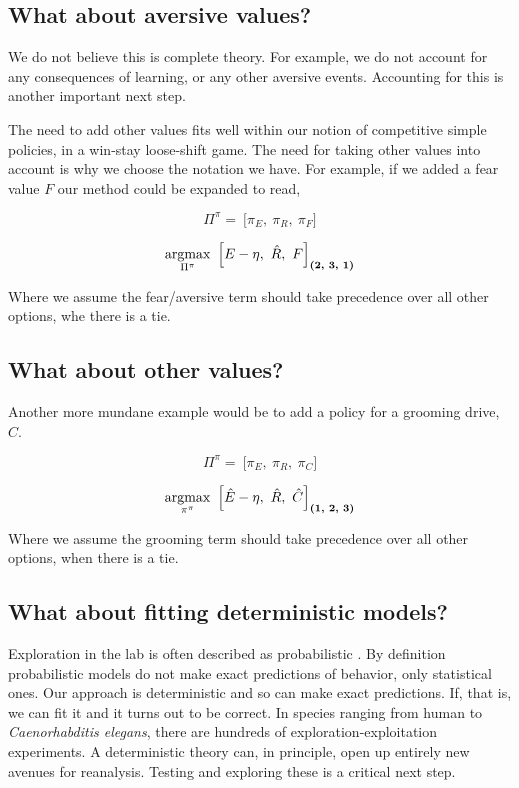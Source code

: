 \subsection*{What about aversive values?}
We do not believe this is complete theory. For example, we do not account for any consequences of learning, or any other aversive events. Accounting for this is another important next step.

The need to add other values fits well within our notion of competitive simple policies, in a win-stay loose-shift game. The need for taking other values into account is why we choose the notation we have. For example, if we added a fear value $F$ our method could be expanded to read,

\begin{equation}
\label{eq:pipi_f} 
\Pi^{\pi} = \ \Big [ \pi_E,\ \pi_R,\ \pi_F \Big ]
\end{equation}

\begin{equation}
\label{eq:meta_greedy_f} 
	\operatorname*{argmax}_{\Pi^{\pi}} \ \Big [ E - \eta,\ \hat R,\ F \Big ]_{\textbf{(2, 3, 1)}}
\end{equation}

Where we assume the fear/aversive term should take precedence over all other options, whe there is a tie. 


\subsection*{What about other values?}
Another more mundane example would be to add a policy for a grooming drive, $C$. 

\begin{equation}
\label{eq:pipi_g} 
\Pi^{\pi} = \ \Big [ \pi_E,\ \pi_R,\ \pi_C \Big ]
\end{equation}

\begin{equation}
\label{eq:meta_greedy_g} 
	\operatorname*{argmax}_{\pi^{\pi}} \ \Big [ \hat E - \eta,\ \hat R, \ \hat C \Big ]_{\textbf{(1, 2, 3)}}
\end{equation}

Where we assume the grooming term should take precedence over all other options, when there is a tie. 

\subsection*{What about fitting deterministic models?}
Exploration in the lab is often described as probabilistic \citep{Calhoun2014,Song2019a,Gershman2018b,Schulz2018a}. By definition probabilistic models do not make exact predictions of behavior, only statistical ones. Our approach is deterministic and so can make exact predictions. If, that is, we can fit it and it turns out to be correct. In species ranging from human to \textit{Caenorhabditis elegans}, there are hundreds of exploration-exploitation experiments. A deterministic theory can, in principle, open up entirely new avenues for reanalysis. Testing and exploring these is a critical next step.


